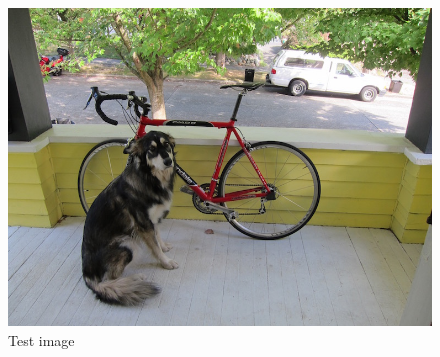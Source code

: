 \documentclass{sig-alternate-05-2015}
\begin{document}
\begin{figure}
\centering
\includegraphics[width=\linewidth]{../data/dog.jpg}
\caption{Test image}
\label{fig:test_image}
\end{figure}



\end{document}
